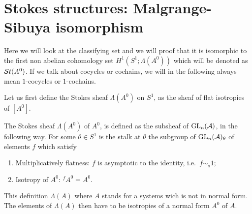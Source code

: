 \section{Stokes structures: Malgrange-Sibuya isomorphism}\label{sec:mainThm1}
Here we will look at the classifying set and we will proof that it is
isomorphic \TODO[as\dots] to the first non abelian cohomology set
$H^1(S^1;\Lambda(A^0))$ which will be denoted as $\mathcal{S}{}t(A^0)$.
If we talk about cocycles or cochains, we will in the following always mean
$1$-cocycles or $1$-cochains.

Let us first define the Stokes sheaf $\Lambda(A^0)$ on $S^1$, as the sheaf of
flat isotropies of $[A^0]$.
\begin{defn}\label{defn:StokesSheaf}
  \begin{comment}
    The Stokes sheaf $\Lambda(A^0)$ of $A^0$, is the sheaf of groups defined on
    $S^1$ whose stalk at any point $\theta\in S^1$ is the group of germs of
    $f\in\Gl_n(\cO(\mathfrak{s}))$, $\mathfrak{s}$ a sector containing
    $\theta$, satisfying the conditions:
    \begin{enumerate}
      \item Flatness:
        $\underset{x\in\mathfrak{s}}{\underset{x\to0}{\lim}}f(x)=1$ and
        $f\sim_{\mathfrak{s}} 1$;
        \PROBLEM[Why two condition?]
      \item Isotropy of $A^0$: ${}^f\!A^0=A^0$.
    \end{enumerate}
  \end{comment}
  The Stokes sheaf $\Lambda(A^0)$ of $A^0$, is defined as the subsheaf of
  $\operatorname{GL}_n(\mathcal{A})$, in the following way.
  For some $\theta\in S^1$ is the stalk at $\theta$ the subgroup of
  $\operatorname{GL}_n(\mathcal{A})_\theta$ of elements $f$ which satisfy
  \begin{enumerate}
    \item Multiplicatively flatness: $f$ is asymptotic to the identity,
      i.e.\ $f\sim_{\mathfrak{s}} 1$;
    \item Isotropy of $A^0$: ${}^f\!A^0=A^0$.
  \end{enumerate}
  \begin{s-rem}
    This definition  $\Lambda(A)$ where $A$ stands
    for a systems wich is not in normal form. The elements of $\Lambda(A)$ then
    have to be isotropies of a normal form $A^0$ of $A$.
  \end{s-rem}
\end{defn}

